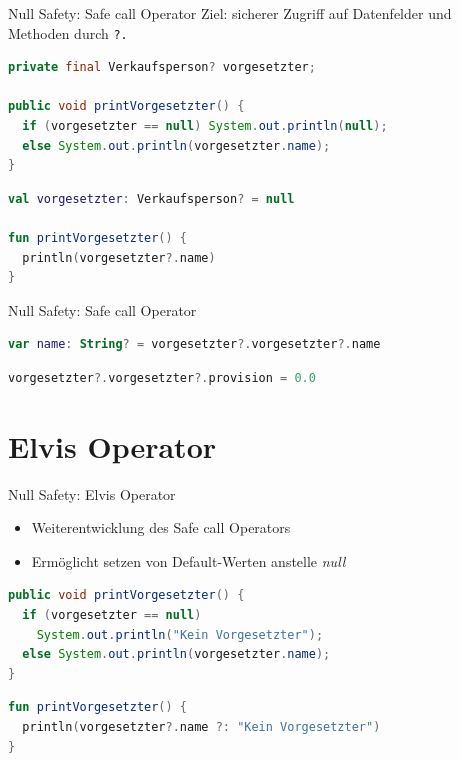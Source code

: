 \documentclass{beamer}
\begin{document}
\begin{frame}[fragile]{Null Safety: Safe call Operator}
  Ziel: sicherer Zugriff auf Datenfelder und Methoden durch \texttt{?.}
  \pause
  \begin{lstlisting}[language=Java, title=in Java]
private final Verkaufsperson? vorgesetzter;

public void printVorgesetzter() {
  if (vorgesetzter == null) System.out.println(null);
  else System.out.println(vorgesetzter.name);
}
  \end{lstlisting}
  \pause
  \begin{lstlisting}[language=Kotlin, title=in Kotlin]
val vorgesetzter: Verkaufsperson? = null

fun printVorgesetzter() {
  println(vorgesetzter?.name)
} 
  \end{lstlisting}
\end{frame}

\begin{frame}[fragile]{Null Safety: Safe call Operator}
  \begin{lstlisting}[language=Kotlin, title=Verkettung des Operators]
    var name: String? = vorgesetzter?.vorgesetzter?.name
  \end{lstlisting}
  \vspace{1cm}
  \begin{lstlisting}[language=Kotlin, title=Zuweisungen mit dem Operator]
    vorgesetzter?.vorgesetzter?.provision = 0.0
  \end{lstlisting}
\end{frame}

\section{Elvis Operator}

\begin{frame}[fragile]{Null Safety: Elvis Operator}
  \begin{itemize}[<+->]
    \item Weiterentwicklung des Safe call Operators
    \item Ermöglicht setzen von Default-Werten anstelle \textit{null}
  \end{itemize}
  \pause[\thebeamerpauses]
  \begin{lstlisting}[language=Java]
public void printVorgesetzter() {
  if (vorgesetzter == null)
    System.out.println("Kein Vorgesetzter");
  else System.out.println(vorgesetzter.name);
}
  \end{lstlisting}
  \pause
  \begin{lstlisting}[language=Kotlin]
fun printVorgesetzter() {
  println(vorgesetzter?.name ?: "Kein Vorgesetzter")
}
  \end{lstlisting}
\end{frame}
\end{document}
